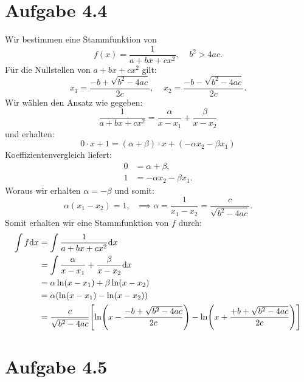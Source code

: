 \documentclass{theozettel}
\begin{document}
\section*{Aufgabe 4.4}
Wir bestimmen eine Stammfunktion von 
	\[
		f(x) = \frac{1}{a+bx+cx^2}, \ \ \ \ \ b^{2} > 4ac.
	\]
Für die Nullstellen von $a+bx+cx^{2}$ gilt:
	\[
		x_{1} = \frac{-b + \sqrt{b^{2}-4ac}}{2c}, \ \ \ \ \ x_{2} = \frac{-b - \sqrt{b^{2}-4ac}}{2c}.
	\]
Wir wählen den Ansatz wie gegeben:
	\[
		\frac{1}{a+bx+cx^2} = \frac{\alpha}{x-x_{1}} + \frac{\beta}{x-x_{2}}
	\]
und erhalten:
	\[
		0 \cdot x + 1 = (\alpha + \beta) \cdot x + (- \alpha x_{2} - \beta x_{1})
	\]
Koeffizientenvergleich liefert:
	\begin{align*}
		0 &= \alpha + \beta, \\
		1 &= -\alpha x_{2} - \beta x_{1}.
	\end{align*}
Woraus wir erhalten $\alpha = - \beta$ und somit:
	\[
		\alpha (x_{1} - x_{2}) = 1, \ \ \ \implies \alpha = \frac{1}{x_{1} - x_{2}} = \frac{c}{\sqrt{b^{2}-4ac}}.
	\]
Somit erhalten wir eine Stammfunktion von $f$ durch:
	\begin{align*}
		\int f \dd x &= \int \frac{1}{a+bx+cx^2} \dd x \\
		&= \int \frac{\alpha}{x-x_{1}} + \frac{\beta}{x-x_{2}} \dd x \\
		&= \alpha \ln(x-x_{1}) + \beta \ln(x-x_{2}) \\
		&= \alpha \qty(\ln(x-x_{1}) - \ln(x-x_{2})) \\
		&= \frac{c}{\sqrt{b^{2}-4ac}} \qty[ \ln(x - \frac{-b + \sqrt{b^{2}-4ac}}{2c}) - \ln(x + \frac{+b + \sqrt{b^{2}-4ac}}{2c}) ]
	\end{align*}


\newpage
\section*{Aufgabe 4.5}
\end{document}
